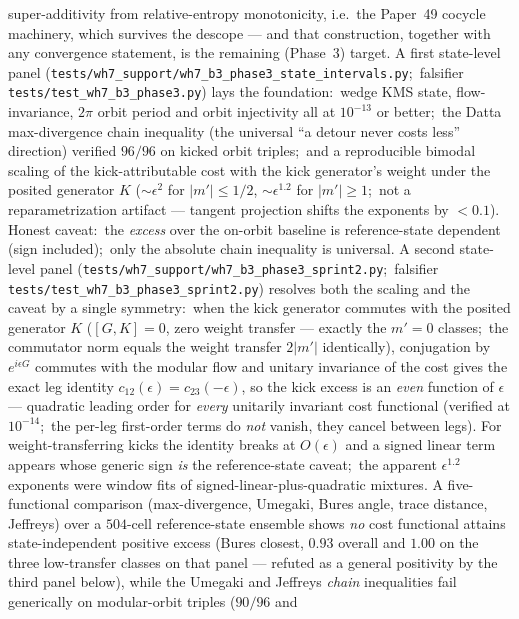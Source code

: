 \documentclass[11pt,a4paper]{article}
\theoremstyle{plain}
\theoremstyle{definition}
\begin{document}
\begin{enumerate}
super-additivity from relative-entropy monotonicity, i.e.\ the
Paper~49 cocycle machinery, which survives the descope — and that
construction, together with any convergence statement, is the
remaining (Phase~3) target. A first state-level panel
(\texttt{tests/wh7\_support/wh7\_b3\_phase3\_state\_intervals.py};\ falsifier
\texttt{tests/test\_wh7\_b3\_phase3.py}) lays the foundation:\ wedge
KMS state, flow-invariance, $2\pi$ orbit period and orbit injectivity
all at $10^{-13}$ or better;\ the Datta max-divergence chain
inequality (the universal ``a detour never costs less'' direction)
verified $96/96$ on kicked orbit triples;\ and a reproducible bimodal
scaling of the kick-attributable cost with the kick generator's weight
under the posited generator $K$ ($\sim\epsilon^{2}$ for $|m'| \le 1/2$, $\sim\epsilon^{1.2}$
for $|m'| \ge 1$;\ not a reparametrization artifact — tangent
projection shifts the exponents by $< 0.1$). Honest caveat:\ the
\emph{excess} over the on-orbit baseline is reference-state
dependent (sign included);\ only the absolute chain inequality is
universal. A second state-level panel
(\texttt{tests/wh7\_support/wh7\_b3\_phase3\_sprint2.py};\ falsifier
\texttt{tests/test\_wh7\_b3\_phase3\_sprint2.py}) resolves both the
scaling and the caveat by a single symmetry:\ when the kick generator
commutes with the posited generator $K$ ($[G, K] = 0$, zero weight transfer — exactly
the $m' = 0$ classes;\ the commutator norm equals the weight transfer
$2|m'|$ identically), conjugation by $e^{i\epsilon G}$ commutes with
the modular flow and unitary invariance of the cost gives the exact
leg identity $c_{12}(\epsilon) = c_{23}(-\epsilon)$, so the kick
excess is an \emph{even} function of $\epsilon$ — quadratic leading
order for \emph{every} unitarily invariant cost functional (verified
at $10^{-14}$;\ the per-leg first-order terms do \emph{not} vanish,
they cancel between legs). For weight-transferring kicks the identity
breaks at $O(\epsilon)$ and a signed linear term appears whose
generic sign \emph{is} the reference-state caveat;\ the apparent
$\epsilon^{1.2}$ exponents were window fits of
signed-linear-plus-quadratic mixtures. A five-functional comparison
(max-divergence, Umegaki, Bures angle, trace distance, Jeffreys) over
a $504$-cell reference-state ensemble shows \emph{no} cost functional
attains state-independent positive excess (Bures closest, $0.93$
overall and $1.00$ on the three low-transfer classes on that panel —
refuted as a general positivity by the third panel below), while the
Umegaki and Jeffreys \emph{chain}
inequalities fail generically on modular-orbit triples ($90/96$ and

\end{enumerate}
\end{document}
